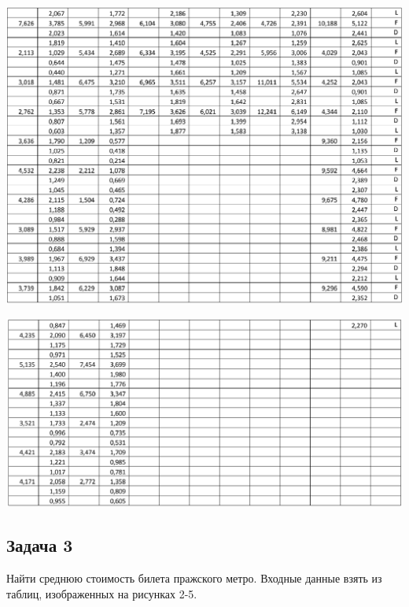 \documentclass[a4paper, 12pt]{article}   	%
\begin{document}
    \begin{center}
        \begin{minipage}{0.9\linewidth}
            \includegraphics[width=\linewidth]{img/task_2_2}
        \end{minipage}
    \end{center}
    \begin{center}
        \begin{minipage}{0.9\linewidth}
            \includegraphics[width=\linewidth]{img/task_2_3}
        \end{minipage}
    \end{center}


\subsection{Задача 3}
    Найти среднюю стоимость билета пражского метро. Входные данные взять из таблиц, изображенных на рисунках 2-5.
\newpage
\end{document}
